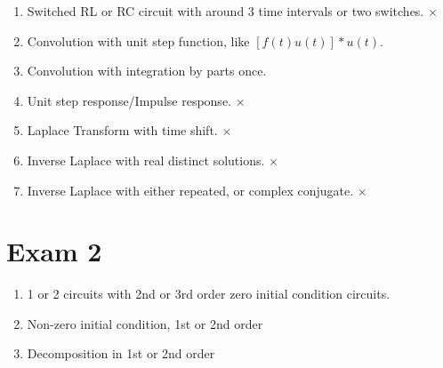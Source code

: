 \documentclass[nobib]{tufte-handout}
\begin{document}
\begin{enumerate}
    \item Switched RL or RC circuit with around 3 time intervals or two switches. $\times$
    \item Convolution with unit step function, like $[f(t)u(t)]*u(t)$. 
    \item Convolution with integration by parts once. 
    \item Unit step response/Impulse response. $\times$
    \item Laplace Transform with time shift. $\times$
    \item Inverse Laplace with real distinct solutions. $\times$
    \item Inverse Laplace with either repeated, or complex conjugate. $\times$
\end{enumerate}
\section{Exam 2}
\begin{enumerate}
    \item 1 or 2 circuits with 2nd or 3rd order zero initial condition circuits.
    \item Non-zero initial condition, 1st or 2nd order
    \item Decomposition in 1st or 2nd order
\end{enumerate}
\end{document}
